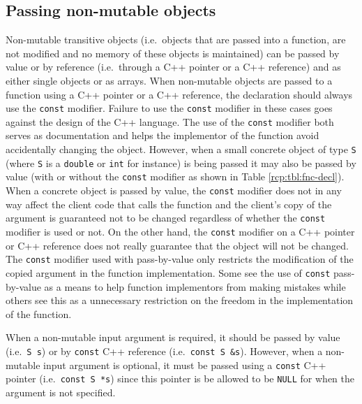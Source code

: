 %
\subsection{Passing non-mutable objects}
%

Non-mutable transitive objects (i.e.~objects that are passed into a
function, are not modified and no memory of these objects is
maintained) can be passed by value or by reference (i.e.~through a C++
pointer or a C++ reference) and as either single objects or as arrays.
When non-mutable objects are passed to a function using a C++ pointer
or a C++ reference, the declaration should always use the
{}\texttt{const} modifier.  Failure to use the {}\texttt{const}
modifier in these cases goes against the design of the C++ language.
The use of the {}\texttt{const} modifier both serves as documentation
and helps the implementor of the function avoid accidentally changing
the object.  However, when a small concrete object of type
{}\texttt{S} (where {}\texttt{S} is a {}\texttt{double} or
{}\texttt{int} for instance) is being passed it may also be passed by
value (with or without the {}\texttt{const} modifier as shown in Table
{}\ref{rcp:tbl:fnc-decl}).  When a concrete object is passed by value,
the {}\texttt{const} modifier does not in any way affect the client
code that calls the function and the client's copy of the argument is
guaranteed not to be changed regardless of whether the
{}\texttt{const} modifier is used or not.  On the other hand, the
{}\texttt{const} modifier on a C++ pointer or C++ reference does not
really guarantee that the object will not be changed.  The
{}\texttt{const} modifier used with pass-by-value only restricts the
modification of the copied argument in the function implementation.
Some see the use of {}\texttt{const} pass-by-value as a means to help
function implementors from making mistakes while others see this as a
unnecessary restriction on the freedom in the implementation of the
function.

When a non-mutable input argument is required, it should be passed by
value (i.e.~{}\texttt{S s}) or by {}\texttt{const} C++ reference
(i.e.~{}\texttt{const S \&s}).  However, when a non-mutable input
argument is optional, it must be passed using a {}\texttt{const} C++
pointer (i.e.~{}\texttt{const S *s}) since this pointer is be allowed
to be {}\texttt{NULL} for when the argument is not specified.

